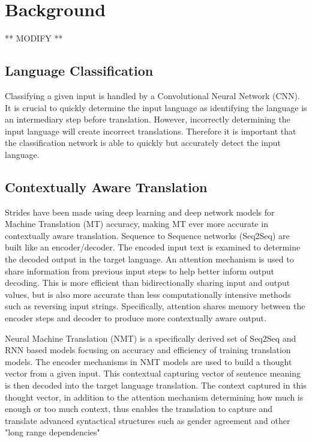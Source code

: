 \documentclass[10pt,a4paper]{article}
\begin{document}
\clearpage

\section{Background}
** MODIFY **
\subsection{Language Classification}

  Classifying a given input is handled by a Convolutional Neural Network (CNN). It is crucial to quickly determine the input language as identifying the language is an intermediary step before translation. However, incorrectly determining the input language will create incorrect translations. Therefore it is important that the classification network is able to quickly but accurately detect the input language.

\subsection{Contextually Aware Translation}

  Strides have been made using deep learning and deep network models for Machine Translation (MT) accuracy, making MT ever more accurate in contextually aware translation. Sequence to Sequence networks (Seq2Seq) are built like an encoder/decoder. The encoded input text is examined to determine the decoded output in the target language. An attention mechanism is used to share information from previous input steps to help better inform output decoding. This is more efficient than bidirectionally sharing input and output values, but is also more accurate than less computationally intensive methods such as reversing input strings. Specifically, attention shares memory between the encoder steps and decoder to produce more contextually aware output.

  Neural Machine Translation (NMT) is a specifically derived set of Seq2Seq and RNN based models focusing on accuracy and efficiency of training translation models. The encoder mechanisms in NMT models are used to build a thought vector from a given input. This contextual capturing vector of sentence meaning is then decoded into the target language translation. The context captured in this thought vector, in addition to the attention mechanism determining how much is enough or too much context, thus enables the translation to capture and translate advanced syntactical structures such as gender agreement and other "long range dependencies"
\end{document}
